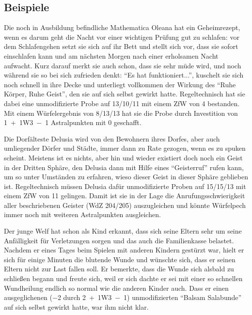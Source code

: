 \subsection{Beispiele}
Die noch in Ausbildung befindliche Mathematica Oleana hat ein Geheimrezept, wenn es darum geht die Nacht vor einer wichtigen Prüfung gut zu schlafen: vor dem Schlafengehen setzt sie sich auf ihr Bett und stellt sich vor, dass sie sofort einschlafen kann und am nächsten Morgen nach einer erholsamen Nacht aufwacht. Kurz darauf merkt sie auch schon, dass sie sehr müde wird, und noch während sie so bei sich zufrieden denkt: \enquote{Es hat funktioniert...}, kuschelt sie sich noch schnell in ihre Decke und unterliegt vollkommen der Wirkung des \enquote{Ruhe Körper, Ruhe Geist}, den sie auf sich selbst gewirkt hatte. Regeltechnisch hat sie dabei eine unmodifizierte Probe auf 13/10/11 mit einem ZfW von 4 bestanden. Mit einem Würfelergebnis von 8/13/13 hat sie die Probe durch Investition von 1~+~1W3~−~1 Astralpunkten mit \SI{0}{\ZfPstern} geschafft.

Die Dorfälteste Delusia wird von den Bewohnern ihres Dorfes, aber auch umliegender Dörfer und Städte, immer dann zu Rate gezogen, wenn es zu spuken scheint. Meistens ist es nichts, aber hin und wieder existiert doch noch ein Geist in der Dritten Sphäre, den Delusia dann mit Hilfe eines \enquote{Geisterruf} rufen kann, um so unter Umständen zu erfahren, wieso dieser Geist in dieser Sphäre geblieben ist. Regeltechnisch müssen Delusia dafür unmodifizierte Proben auf 15/15/13 mit einem ZfW von 11 gelingen. Damit ist sie in der Lage die Anrufungsschwierigkeit aller beschriebenen Geister (WdZ 204/205) auszugleichen und könnte Würfelpech immer noch mit weiteren Astralpunkten ausgleichen.

Der junge Welf hat schon als Kind erkannt, dass sich seine Eltern sehr um seine Anfälligkeit für Verletzungen sorgen und das auch die Familienkasse belastet. Nachdem er eines Tages beim Spielen mit anderen Kindern gestürzt war, hielt er sich für einige Minuten die blutende Wunde und wünschte sich, dass er seinen Eltern nicht zur Last fallen soll. Er bemerkte, dass die Wunde sich alsbald zu schließen begann und freute sich, weil er sich dachte er sei mit einer so schnellen Wundheilung endlich so normal wie die anderen Kinder auch. Dass er einen ausgeglichenen (\SI{-2}{\ZfPstern} durch 2~+~1W3~−~\SI{1}{\AsP}) unmodifizierten \enquote{Balsam Salabunde} auf sich selbst gewirkt hatte, war ihm nicht klar.

